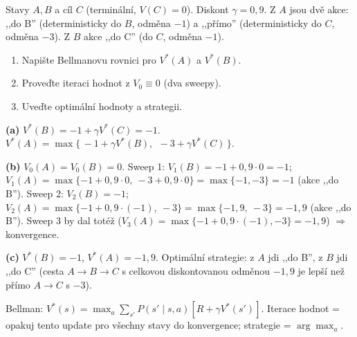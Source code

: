 \begin{zadani}
Stavy $A,B$ a cíl $C$ (terminální, $V(C)=0$). Diskont $\gamma=0{,}9$. Z $A$ jsou dvě akce: ,,do B'' (deterministicky do $B$, odměna $-1$) a ,,přímo'' (deterministicky do $C$, odměna $-3$). Z $B$ akce ,,do C'' (do $C$, odměna $-1$).
\begin{enumerate}[label=(\alph*)]
  \item {} Napište Bellmanovu rovnici pro $V^*(A)$ a $V^*(B)$.
  \item {} Proveďte iteraci hodnot z $V_0\equiv0$ (dva sweepy).
  \item {} Uveďte optimální hodnoty a strategii.
\end{enumerate}
\end{zadani}

\begin{reseni}
\textbf{(a)} $V^*(B)=-1+\gamma V^*(C)=-1$. $V^*(A)=\max\{\,-1+\gamma V^*(B),\ \ -3+\gamma V^*(C)\,\}$.

\textbf{(b)} $V_0(A)=V_0(B)=0$.
Sweep 1: $V_1(B)=-1+0{,}9\cdot0=-1$; $V_1(A)=\max\{-1+0{,}9\cdot0,\ -3+0{,}9\cdot0\}=\max\{-1,-3\}=-1$ (akce ,,do B'').
Sweep 2: $V_2(B)=-1$; $V_2(A)=\max\{-1+0{,}9\cdot(-1),\ -3\}=\max\{-1{,}9,\ -3\}=-1{,}9$ (akce ,,do B'').
Sweep 3 by dal totéž ($V_3(A)=\max\{-1+0{,}9\cdot(-1),-3\}=-1{,}9$) $\Rightarrow$ konvergence.

\textbf{(c)} $V^*(B)=-1$, $V^*(A)=-1{,}9$. Optimální strategie: z $A$ jdi ,,do B'', z $B$ jdi ,,do C'' (cesta $A\to B\to C$ s celkovou diskontovanou odměnou $-1{,}9$ je lepší než přímo $A\to C$ s $-3$).
\end{reseni}

\begin{jadro}
Bellman: $V^*(s)=\max_a\sum_{s'}P(s'\mid s,a)[R+\gamma V^*(s')]$. Iterace hodnot = opakuj tento update pro všechny stavy do konvergence; strategie = $\arg\max_a$.
\end{jadro}


